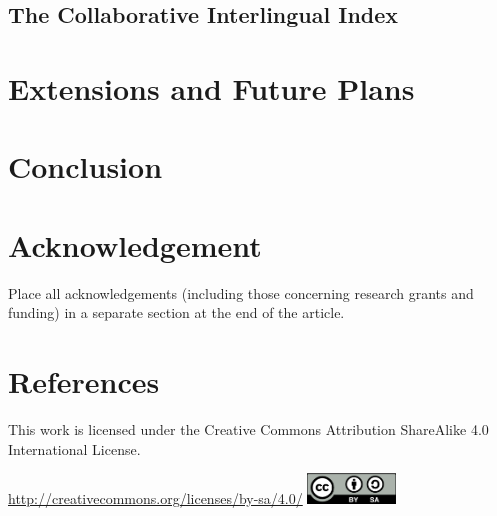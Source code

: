 \documentclass[12pt,a4paper]{elex2017}
\begin{document}
\subsection{The Collaborative Interlingual Index}

\section{Extensions and Future Plans}

\section{Conclusion}

\section*{Acknowledgement} 

Place all acknowledgements (including those concerning research grants and
funding) in a separate section at the end of the article.

\section*{References}

\printbibliography[
    type={book},
    notkeyword={dictionary},
    title={Books}
]
\printbibliography[
    type={incollection},
    title={Book Sections}
]
\printbibliography[
    type={inproceedings},
    title={Paper in conference proceedings}
]
\printbibliography[
    type={article},
    title={Journal Articles}
]
\printbibliography[
    type={misc},
    title={Technical Reports}
]
\printbibliography[
    type={book},
    keyword={dictionary},
    title={Dictionaries}
]


\medskip
\begin{minipage}[t]{\textwidth}
    \noindent This work is licensed under the Creative Commons Attribution
    ShareAlike 4.0 International License.
    \vspace{-2ex}
    \begin{center}%
        \url{http://creativecommons.org/licenses/by-sa/4.0/}\linebreak
        \includegraphics[width=2.33cm]{cc.png}%
    \end{center}
\end{minipage}
\end{document}
